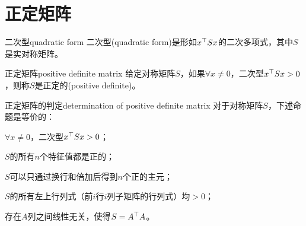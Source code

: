\section{正定矩阵}
\begin{definition}{二次型}{quadratic form}
	二次型(quadratic form)是形如$x^\top Sx$的二次多项式，其中$S$是实对称矩阵。
\end{definition}
\begin{definition}{正定矩阵}{positive definite matrix}
	给定对称矩阵$S$，如果$\forall x\neq 0$，二次型$x^\top Sx>0$，则称$S$是正定的(positive definite)。
\end{definition}
\begin{theorem}{正定矩阵的判定}{determination of positive definite matrix}
	对于对称矩阵$S$，下述命题是等价的：
	\begin{compactenum}
		\item $\forall x\neq 0$，二次型$x^\top Sx>0$；
		\item $S$的所有$n$个特征值都是正的；
		\item $S$可以只通过换行和倍加后得到$n$个正的主元；
		\item $S$的所有左上行列式（前$i$行$i$列子矩阵的行列式）均$>0$；
		\item 存在$A$列之间线性无关，使得$S=A^\top A$。
	\end{compactenum}
\end{theorem}
